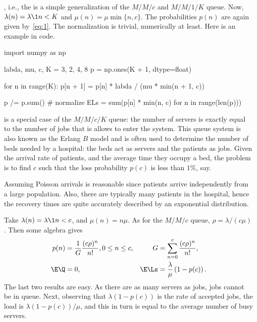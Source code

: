 , i.e.,  the  is a simple generalization of the $M/M/c$ and $M/M/1/K$ queue.
Now, $\lambda(n) = \lambda\1{n<K}$ and $\mu(n) = \mu \min\{n, c\}$.
The probabilities $p(n)$ are again given by~\cref{eq:1}.
The normalization is trivial, numerically at least.
Here is an example in code.
\begin{pyconsole}
import numpy as np

labda, mu, c, K = 3, 2, 4, 8
p = np.ones(K + 1, dtype=float)

for n in range(K):
    p[n + 1] = p[n] * labda / (mu * min(n + 1, c))

p /= p.sum()  # normalize
ELs = sum(p[n] * min(n, c) for n in range(len(p)))
\end{pyconsole}

 is a special case of the $M/M/c/K$ queue: the number of servers is exactly equal to the number of jobs that is allows to enter the system.
This queue system is also known as the Erlang $B$ model and is often used to determine the number of beds needed by a hospital: the beds act as servers and the patients as jobs.
Given the arrival rate of patients, and the average time they occupy a bed, the problem is to find $c$ such that the loss probability $p(c)$ is less than $1\%$, say.

Assuming Poisson arrivals is reasonable since patients arrive independently from a large population.
Also, there are typically many patients in the hospital, hence the recovery times are quite accurately described by an exponential distribution.

Take $\lambda(n) = \lambda\1{n<c}$, and $\mu(n) = n \mu$.
As for the $M/M/c$ queue, $\rho = \lambda/(c \mu)$.
Then some algebra gives
 \begin{align*}
   p(n) &= \frac 1 G \frac{(c\rho)^n}{n!}, 0\leq n \leq c, &
   G&=\sum_{n=0}^{c} \frac{(c\rho)^n}{n!},\\
   \E \Q &= 0, &
\E \Ls &= \frac{\lambda}{\mu} \left(1- p(c)\right).
 \end{align*}
 The last two results are easy.
 As there are as many servers as jobs, jobs cannot be in queue.
 Next, observing that $\lambda(1-p(c))$ is the rate of accepted jobs, the load is $\lambda(1-p(c))/\mu$, and this in turn is equal to the average number of busy servers.


